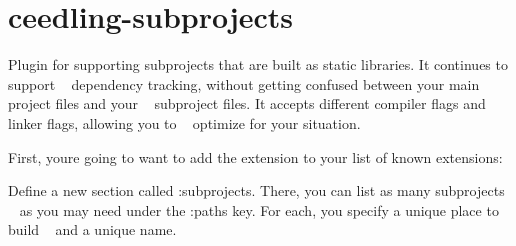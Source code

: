 \chapter{ceedling-\/subprojects}
\hypertarget{md__unit_test_framework_2vendor_2ceedling_2plugins_2subprojects_2_r_e_a_d_m_e}{}\label{md__unit_test_framework_2vendor_2ceedling_2plugins_2subprojects_2_r_e_a_d_m_e}
Plugin for supporting subprojects that are built as static libraries. It continues to support ~\newline
 dependency tracking, without getting confused between your main project files and your ~\newline
 subproject files. It accepts different compiler flags and linker flags, allowing you to ~\newline
 optimize for your situation.

First, you\textquotesingle{}re going to want to add the extension to your list of known extensions\+:


\begin{DoxyCode}{0}

\end{DoxyCode}


Define a new section called \+:subprojects. There, you can list as many subprojects ~\newline
 as you may need under the \+:paths key. For each, you specify a unique place to build ~\newline
 and a unique name.


\begin{DoxyCode}{0}

\end{DoxyCode}


